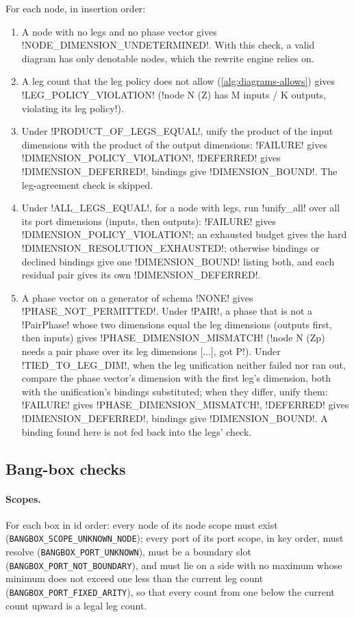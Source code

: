 For each node, in insertion order:
\begin{enumerate}
\item A node with no legs and no phase vector gives \code!NODE_DIMENSION_UNDETERMINED!. With this check, a valid diagram has only denotable nodes, which the rewrite engine relies on.
\item A leg count that the leg policy does not allow (\cref{alg:diagrams-allows}) gives \code!LEG_POLICY_VIOLATION! (\code!node N (Z) has M inputs / K outputs, violating its leg policy!).
\item Under \code!PRODUCT_OF_LEGS_EQUAL!, unify the product of the input dimensions with the product of the output dimensions: \code!FAILURE! gives \code!DIMENSION_POLICY_VIOLATION!, \code!DEFERRED! gives \code!DIMENSION_DEFERRED!, bindings give \code!DIMENSION_BOUND!. The leg-agreement check is skipped.
\item Under \code!ALL_LEGS_EQUAL!, for a node with legs, run \py!unify_all! over all its port dimensions (inputs, then outputs): \code!FAILURE! gives \code!DIMENSION_POLICY_VIOLATION!; an exhausted budget gives the hard \code!DIMENSION_RESOLUTION_EXHAUSTED!; otherwise bindings or declined bindings give one \code!DIMENSION_BOUND! listing both, and each residual pair gives its own \code!DIMENSION_DEFERRED!.
\item A phase vector on a generator of schema \code!NONE! gives \code!PHASE_NOT_PERMITTED!. Under \code!PAIR!, a phase that is not a \py!PairPhase! whose two dimensions equal the leg dimensions (outputs first, then inputs) gives \code!PHASE_DIMENSION_MISMATCH! (\code!node N (Zp) needs a pair phase over its leg dimensions [...], got P!). Under \code!TIED_TO_LEG_DIM!, when the leg unification neither failed nor ran out, compare the phase vector's dimension with the first leg's dimension, both with the unification's bindings substituted; when they differ, unify them: \code!FAILURE! gives \code!PHASE_DIMENSION_MISMATCH!, \code!DEFERRED! gives \code!DIMENSION_DEFERRED!, bindings give \code!DIMENSION_BOUND!. A binding found here is not fed back into the legs' check.
\end{enumerate}

\subsection{Bang-box checks}\label{sec:diagrams-validate-boxes}

\paragraph{Scopes.} For each box in id order: every node of its node scope must exist (\texttt{BANGBOX\_SCOPE\_UNKNOWN\_NODE}); every port of its port scope, in key order, must resolve (\texttt{BANGBOX\_PORT\_UNKNOWN}), must be a boundary slot (\texttt{BANGBOX\_PORT\_NOT\_BOUNDARY}), and must lie on a side with no maximum whose minimum does not exceed one less than the current leg count (\texttt{BANGBOX\_PORT\_FIXED\_ARITY}), so that every count from one below the current count upward is a legal leg count.

